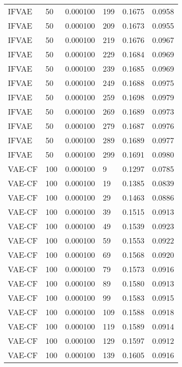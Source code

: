 \begin{tabular}{llrlrr}
   IFVAE &   50 &  0.000100 &   199 &  0.1675 &       0.0958 \\
   IFVAE &   50 &  0.000100 &   209 &  0.1673 &       0.0955 \\
   IFVAE &   50 &  0.000100 &   219 &  0.1676 &       0.0967 \\
   IFVAE &   50 &  0.000100 &   229 &  0.1684 &       0.0969 \\
   IFVAE &   50 &  0.000100 &   239 &  0.1685 &       0.0969 \\
   IFVAE &   50 &  0.000100 &   249 &  0.1688 &       0.0975 \\
   IFVAE &   50 &  0.000100 &   259 &  0.1698 &       0.0979 \\
   IFVAE &   50 &  0.000100 &   269 &  0.1689 &       0.0973 \\
   IFVAE &   50 &  0.000100 &   279 &  0.1687 &       0.0976 \\
   IFVAE &   50 &  0.000100 &   289 &  0.1689 &       0.0977 \\
   IFVAE &   50 &  0.000100 &   299 &  0.1691 &       0.0980 \\
  VAE-CF &  100 &  0.000100 &     9 &  0.1297 &       0.0785 \\
  VAE-CF &  100 &  0.000100 &    19 &  0.1385 &       0.0839 \\
  VAE-CF &  100 &  0.000100 &    29 &  0.1463 &       0.0886 \\
  VAE-CF &  100 &  0.000100 &    39 &  0.1515 &       0.0913 \\
  VAE-CF &  100 &  0.000100 &    49 &  0.1539 &       0.0923 \\
  VAE-CF &  100 &  0.000100 &    59 &  0.1553 &       0.0922 \\
  VAE-CF &  100 &  0.000100 &    69 &  0.1568 &       0.0920 \\
  VAE-CF &  100 &  0.000100 &    79 &  0.1573 &       0.0916 \\
  VAE-CF &  100 &  0.000100 &    89 &  0.1580 &       0.0913 \\
  VAE-CF &  100 &  0.000100 &    99 &  0.1583 &       0.0915 \\
  VAE-CF &  100 &  0.000100 &   109 &  0.1588 &       0.0918 \\
  VAE-CF &  100 &  0.000100 &   119 &  0.1589 &       0.0914 \\
  VAE-CF &  100 &  0.000100 &   129 &  0.1597 &       0.0912 \\
  VAE-CF &  100 &  0.000100 &   139 &  0.1605 &       0.0916 \\

\end{tabular}

